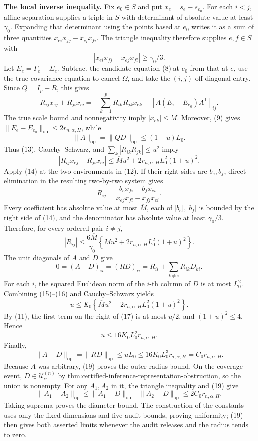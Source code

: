 \textbf{The local inverse inequality.}
Fix \(e_0\in S\) and put \(x_e=s_e-s_{e_0}\).  For each \(i<j\), affine separation supplies a triple in \(S\) with determinant of absolute value at least \(\gamma _0\).  Expanding that determinant using the points based at \(e_0\) writes it as a sum of three quantities
\(
x_{ei}x_{fj}-x_{ej}x_{fi}
\).
The triangle inequality therefore supplies \(e,f\in S\) with
\[
 |x_{ei}x_{fj}-x_{ej}x_{fi}|\geq\gamma _0/3.
 \tag{12}
\]
Let \(E_e=\Gamma_e-\Sigma_e\).  Subtract the candidate equation (8) at \(e_0\) from that at \(e\), use the true covariance equation to cancel \(\Omega\), and take the \((i,j)\) off-diagonal entry.  Since \(Q=I_p+R\), this gives
\[
 R_{ij}x_{ej}+R_{ji}x_{ei}
 =-\sum_{k=1}^pR_{ik}R_{jk}x_{ek}
 -[A(E_e-E_{e_0})A^{\mathsf T}]_{ij}.
 \tag{13}
\]
The true scale bound and nonnegativity imply \(|x_{ek}|\leq\overline M\).  Moreover, (9) gives \(\|E_e-E_{e_0}\|_{\mathrm{op}}\leq2r_{n,\alpha,H}\), while
\[
 \|A\|_{\mathrm{op}}=\|QD\|_{\mathrm{op}}
 \leq(1+u)L_0.
\]
Thus (13), Cauchy--Schwarz, and \(\sum_k|R_{ik}R_{jk}|\leq u^2\) imply
\[
 |R_{ij}x_{ej}+R_{ji}x_{ei}|
 \leq\overline M u^2+2r_{n,\alpha,H}L_0^2(1+u)^2.
 \tag{14}
\]
Apply (14) at the two environments in (12).  If their right sides are \(b_e,b_f\), direct elimination in the resulting two-by-two system gives
\[
 R_{ij}=
 \frac{b_ex_{fi}-b_fx_{ei}}
 {x_{ej}x_{fi}-x_{fj}x_{ei}}.
\]
Every coefficient has absolute value at most \(\overline M\), each of \(|b_e|,|b_f|\) is bounded by the right side of (14), and the denominator has absolute value at least \(\gamma _0/3\).  Therefore, for every ordered pair \(i\neq j\),
\[
 |R_{ij}|\leq\frac{6\overline M}{\gamma _0}
 \left\{\overline M u^2+2r_{n,\alpha,H}L_0^2(1+u)^2\right\}.
 \tag{15}
\]
The unit diagonals of \(A\) and \(D\) give
\[
 0=(A-D)_{ii}=(RD)_{ii}
 =R_{ii}+\sum_{k\neq i}R_{ik}D_{ki}.
 \tag{16}
\]
For each \(i\), the squared Euclidean norm of the \(i\)-th column of \(D\) is at most \(L_0^2\).  Combining (15)--(16) and Cauchy--Schwarz yields
\[
 u\leq K_0\left\{\overline M u^2+2r_{n,\alpha,H}L_0^2(1+u)^2\right\}.
 \tag{17}
\]
By (11), the first term on the right of (17) is at most \(u/2\), and \((1+u)^2\leq4\).  Hence
\[
 u\leq16K_0L_0^2r_{n,\alpha,H}.
 \tag{18}
\]
Finally,
\[
 \|A-D\|_{\mathrm{op}}
 =\|RD\|_{\mathrm{op}}
 \leq uL_0
 \leq16K_0L_0^3r_{n,\alpha,H}
 =C_0r_{n,\alpha,H}.
 \tag{19}
\]
Because \(A\) was arbitrary, (19) proves the outer-radius bound.  On the coverage event, \(D\in\mathcal U^{(n)}_\alpha\) by \(\text{thm:certified-inference-representation-obstruction}\), so the union is nonempty.  For any \(A_1,A_2\) in it, the triangle inequality and (19) give
\[
 \|A_1-A_2\|_{\mathrm{op}}
 \leq\|A_1-D\|_{\mathrm{op}}+\|A_2-D\|_{\mathrm{op}}
 \leq2C_0r_{n,\alpha,H}.
\]
Taking suprema proves the diameter bound.  The construction of the constants uses only the fixed dimensions and five audit bounds, proving uniformity; (19) then gives both asserted limits whenever the audit releases and the radius tends to zero.
